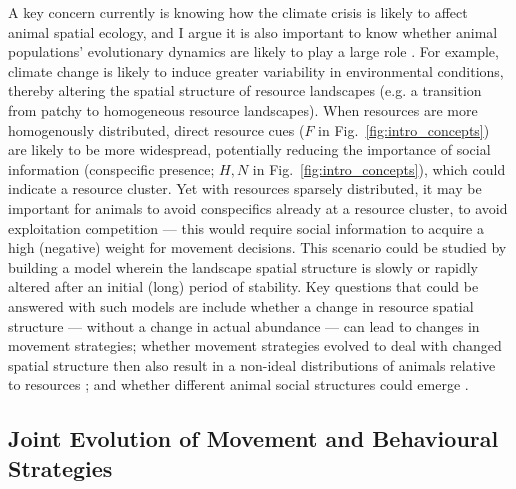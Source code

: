 A key concern currently is knowing how the climate crisis is likely to affect animal spatial ecology, and I argue it is also important to know whether animal populations' evolutionary dynamics are likely to play a large role \parencite[e.g.][]{botero2015}.
For example, climate change is likely to induce greater variability in environmental conditions, thereby altering the spatial structure of resource landscapes (e.g. a transition from patchy to homogeneous resource landscapes).
When resources are more homogenously distributed, direct resource cues ($F$ in Fig.~\ref{fig:intro_concepts}) are likely to be more widespread, potentially reducing the importance of social information (conspecific presence; $H, N$ in Fig.~\ref{fig:intro_concepts}), which could indicate a resource cluster.
Yet with resources sparsely distributed, it may be important for animals to avoid conspecifics already at a resource cluster, to avoid exploitation competition --- this would require social information to acquire a high (negative) weight for movement decisions.
This scenario could be studied by building a model wherein the landscape spatial structure is slowly or rapidly altered after an initial (long) period of stability.
Key questions that could be answered with such models are include whether a change in resource spatial structure --- without a change in actual abundance --- can lead to changes in movement strategies; whether movement strategies evolved to deal with changed spatial structure then also result in a non-ideal distributions of animals relative to resources \parencite[a test of][]{fretwell1970,parker1978}; and whether different animal social structures could emerge \parencite[see a review in][]{webber2022,tanner2012}.

\subsection*{Joint Evolution of Movement and Behavioural Strategies}

